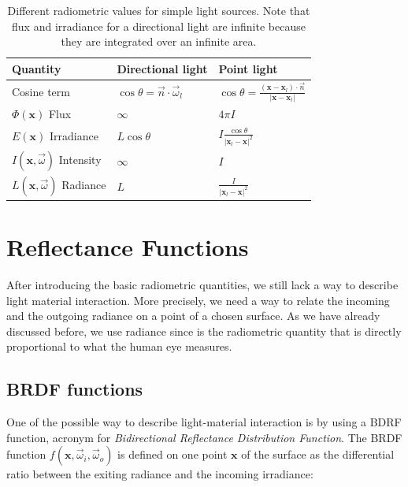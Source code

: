 \renewcommand{\arraystretch}{1.8}
\begin{table}[!ht]
    \centering
    \begin{tabularx}{0.95\textwidth}{|X|X|X|}
    \hline
    Quantity   & Directional light & Point light \\ \hline
    Cosine term       & $\cos\theta = \vec{n} \cdot \vec{\omega}_l$ & $\cos\theta = \frac{(\mathbf{x} - \mathbf{x}_l) \cdot \vec{n}}{|\mathbf{x} - \mathbf{x}_l|}$     \\ \hline

    $\Phi(\mathbf{x})$ Flux       & $\infty$                  & $4 \pi I$           \\ \hline
    $E(\mathbf{x})$ Irradiance & $L \cos\theta $                 & $I \frac{\cos\theta}{|\mathbf{x}_l - \mathbf{x}|^2}$          \\ \hline
    $I(\mathbf{x},\vec{\omega})$ Intensity  & $\infty$                 & $I$           \\ \hline
    $L(\mathbf{x},\vec{\omega})$ Radiance   & $L$               & $\frac{I}{|\mathbf{x}_l - \mathbf{x}|^2}$           \\ \hline
    \end{tabularx}
\caption{Different radiometric values for simple light sources. Note that flux and irradiance for a directional light are infinite because they are integrated over an infinite area.}
\label{table:radio}
\end{table}

\section{Reflectance Functions}
 
After introducing the basic radiometric quantities, we still lack a way to describe light material interaction. More precisely, we need a way to relate the incoming and the outgoing radiance on a point of a chosen surface. As we have already discussed before, we use radiance since is the radiometric quantity that is directly proportional to what the human eye measures. 

\subsection{BRDF functions}

One of the possible way to describe light-material interaction is by using a BDRF function, acronym for \emph{Bidirectional Reflectance Distribution Function}. The BRDF function $f(\mathbf{x}, \vec{\omega}_i, \vec{\omega}_o)$ is defined on one point $\mathbf{x}$ of the surface as the differential ratio between the exiting radiance and the incoming irradiance:

